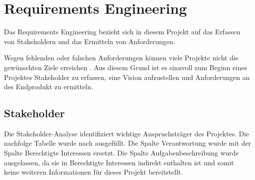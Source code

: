 \chapter{Requirements Engineering}
\label{ch:requirements}

Das Requirements Engineering bezieht sich in diesem Projekt auf das Erfassen von Stakeholdern und das Ermitteln von Anforderungen.

Wegen fehlenden oder falschen Anforderungen können viele Projekte nicht die gewünschten Ziele erreichen \cite[S.~4-9]{Ebert:SystematischesReqEng}. Aus diesem Grund ist es sinnvoll zum Beginn eines Projektes Stakeholder zu erfassen, eine Vision aufzustellen und Anforderungen an des Endprodukt zu ermitteln. \newline


\section{Stakeholder}
\label{sec:stakeholder}

Die Stakeholder-Analyse identifiziert wichtige Anspruchsträger des Projektes. Die nachfolge Tabelle wurde nach \cite[S.~58-60]{Ebert:SystematischesReqEng} ausgefüllt. Die Spalte \glqq{}Verantwortung\grqq{} wurde mit der Spalte \glqq{}Berechtigte Interessen\grqq{} ersetzt. Die Spalte \glqq{}Aufgabenbeschreibung\grqq{} wurde ausgelassen, da sie in \glqq{}Berechtigte Interessen\grqq{} indirekt enthalten ist und somit keine weiteren Informationen für dieses Projekt bereitstellt.

